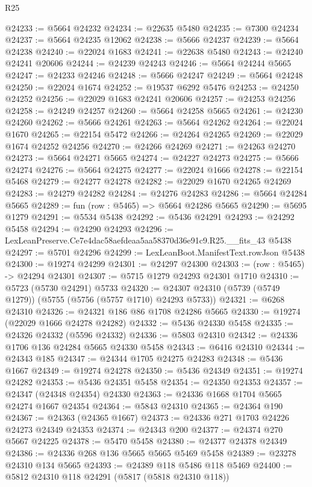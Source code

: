 \begin{lexlean}{R25}
\begin{coremodule}
@24233 := @5664 @24232
@24234 := @22635 @5480
@24235 := @7300 @24234
@24237 := @5664 @24235 @12062
@24238 := @5666 @24237
@24239 := @5664 @24238
@24240 := @22024 @1683
@24241 := @22638 @5480
@24243 := @24240 @24241 @20606
@24244 := @24239 @24243
@24246 := @5664 @24244 @5665
@24247 := @24233 @24246
@24248 := @5666 @24247
@24249 := @5664 @24248
@24250 := @22024 @1674
@24252 := @19537 @6292 @5476
@24253 := @24250 @24252
@24256 := @22029 @1683 @24241 @20606
@24257 := @24253 @24256
@24258 := @24249 @24257
@24260 := @5664 @24258 @5665
@24261 := @24230 @24260
@24262 := @5666 @24261
@24263 := @5664 @24262
@24264 := @22024 @1670
@24265 := @22154 @5472
@24266 := @24264 @24265
@24269 := @22029 @1674 @24252 @24256
@24270 := @24266 @24269
@24271 := @24263 @24270
@24273 := @5664 @24271 @5665
@24274 := @24227 @24273
@24275 := @5666 @24274
@24276 := @5664 @24275
@24277 := @22024 @1666
@24278 := @22154 @5468
@24279 := @24277 @24278
@24282 := @22029 @1670 @24265 @24269
@24283 := @24279 @24282
@24284 := @24276 @24283
@24286 := @5664 @24284 @5665
@24289 := fun (row : @5465) => @5664 @24286 @5665
@24290 := @5695 @1279
@24291 := @5534 @5438
@24292 := @5436 @24291
@24293 := @24292 @5458
@24294 := @24290 @24293
@24296 := LexLeanPreserve.Ce7e4dac58aefdeaa5aa58370d36e91c9.R25.__fits_43 @5438
@24297 := @5701 @24296
@24299 := LexLeanBoot.ManifestText.rowJson @5438
@24300 := @19274 @24299
@24301 := @24297 @24300
@24303 := (row : @5465) -> @24294 @24301
@24307 := @5715 @1279 @24293 @24301 @1710
@24310 := @5723 (@5730 @24291) @5733
@24320 := @24307 @24310 (@5739 (@5749 @1279)) (@5755 (@5756 (@5757 @1710) @24293 @5733))
@24321 := @6268 @24310
@24326 := @24321 @186 @86 @1708 @24286 @5665
@24330 := @19274 (@22029 @1666 @24278 @24282)
@24332 := @5436 @24330 @5458
@24335 := @24326 @24332 (@5596 @24332)
@24336 := @5803 @24310
@24342 := @24336 @1706 @136 @24284 @5665 @24330 @5458
@24343 := @6416 @24310
@24344 := @24343 @185
@24347 := @24344 @1705 @24275 @24283
@24348 := @5436 @1667
@24349 := @19274 @24278
@24350 := @5436 @24349
@24351 := @19274 @24282
@24353 := @5436 @24351 @5458
@24354 := @24350 @24353
@24357 := @24347 (@24348 @24354) @24330
@24363 := @24336 @1668 @1704 @5665 @24274 @1667 @24354
@24364 := @5843 @24310
@24365 := @24364 @190
@24367 := @24363 (@24365 @1667)
@24373 := @24336 @271 @1703 @24226 @24273 @24349 @24353
@24374 := @24343 @200
@24377 := @24374 @270 @5667 @24225
@24378 := @5470 @5458
@24380 := @24377 @24378 @24349
@24386 := @24336 @268 @136 @5665 @5665 @5469 @5458
@24389 := @23278 @24310 @134 @5665
@24393 := @24389 @118 @5486 @118 @5469
@24400 := @5812 @24310 @118 @24291 (@5817 (@5818 @24310 @118))

\end{coremodule}
\end{lexlean}
